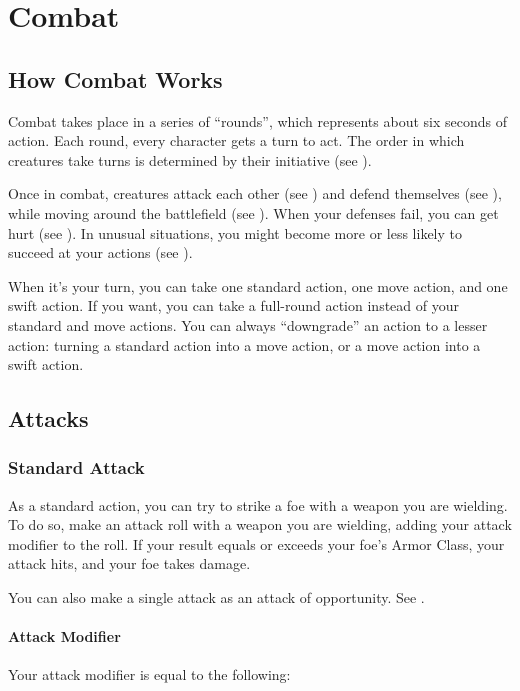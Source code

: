 \chapter{Combat}\label{Combat}

\section{How Combat Works}
Combat takes place in a series of ``rounds'', which represents about six seconds of action. Each round, every character gets a turn to act. The order in which creatures take turns is determined by their initiative (see ). 

Once in combat, creatures attack each other (see ) and defend themselves (see ), while moving around the battlefield (see ). When your defenses fail, you can get hurt (see ). In unusual situations, you might become more or less likely to succeed at your actions (see ).

When it's your turn, you can take one standard action, one move action, and one swift action. If you want, you can take a full-round action instead of your standard and move actions. You can always ``downgrade'' an action to a lesser action: turning a standard action into a move action, or a move action into a swift action.

\section{Attacks}\label{Attacks}

\subsection{Standard Attack}
As a standard action, you can try to strike a foe with a weapon you are wielding. To do so, make an attack roll with a weapon you are wielding, adding your attack modifier to the roll. If your result equals or exceeds your foe's Armor Class, your attack hits, and your foe takes damage.

You can also make a single attack as an attack of opportunity. See . 

\subsubsection{Attack Modifier}
Your attack modifier is equal to the following:

